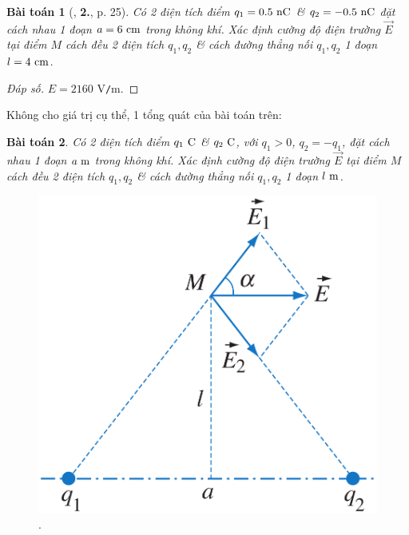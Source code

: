 \documentclass[oneside]{book}
\numberwithin{equation}{section}
\newtheorem{baitoan}{Bài toán}[section]
\begin{document}
\begin{baitoan}[\cite{SGK_Vat_Ly_11_nang_cao}, \textbf{2.}, p. 25]
	Có 2 điện tích điểm $q_1 = 0.5\ {\rm nC}$ \& $q_2 = -0.5\ {\rm nC}$ đặt cách nhau 1 đoạn $a = 6\ {\rm cm}$ trong không khí. Xác định cường độ điện trường $\overrightarrow{E}$ tại điểm $M$ cách đều 2 điện tích $q_1,q_2$ \& cách đường thẳng nối $q_1,q_2$ 1 đoạn $l = 4\ {\rm cm}$.
\end{baitoan}

\begin{proof}[Đáp số]
	$E = 2160$ V\texttt{/}m.
\end{proof}
Không cho giá trị cụ thể, 1 tổng quát của bài toán trên:

\begin{baitoan}
	Có 2 điện tích điểm $q_1\ {\rm C}$ \& $q_2\ {\rm C}$, với $q_1 > 0$, $q_2 = -q_1$, đặt cách nhau 1 đoạn $a\ {\rm m}$ trong không khí. Xác định cường độ điện trường $\overrightarrow{E}$ tại điểm $M$ cách đều 2 điện tích $q_1,q_2$ \& cách đường thẳng nối $q_1,q_2$ 1 đoạn $l\ {\rm m}$.
\end{baitoan}

\begin{figure}[H]
	\centering
	\includegraphics[scale=0.15]{2_dien_tich_tam_giac_can}
	\caption{\cite[Hình 5.2, p. 26]{SGK_Vat_Ly_11_nang_cao}.}
	\label{fig:2 dien tich tam giac can}
\end{figure}
\end{document}
